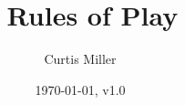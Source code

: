 \documentclass[10pt]{article}
\title{\gametitle~ Rules of Play}
\author{Curtis Miller}
\date{\today, v1.0}
\begin{document}
\maketitle

\begin{multicols}{3}
    
    
    
\end{multicols}
\end{document}
